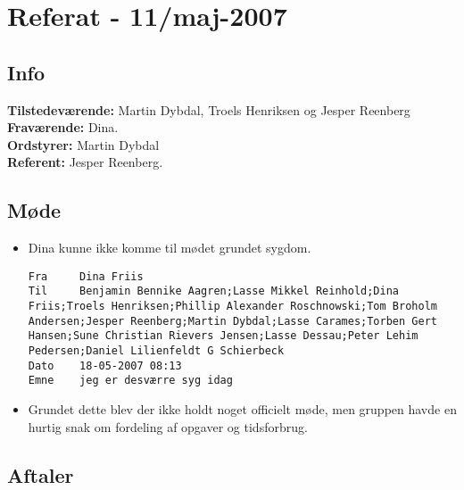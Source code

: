 \documentclass[a4paper,10pt,draft]{article}
\begin{document}
\section{Referat - 11/maj-2007}

\subsection{Info}

\textbf{Tilstedeværende:} Martin Dybdal, Troels Henriksen og Jesper Reenberg\\
\textbf{Fraværende:} Dina.\\
\textbf{Ordstyrer:} Martin Dybdal\\
\textbf{Referent:} Jesper Reenberg.

\subsection{Møde}

\begin{itemize}

\item Dina kunne ikke komme til mødet grundet sygdom.
\begin{verbatim}
Fra 	Dina Friis
Til 	Benjamin Bennike Aagren;Lasse Mikkel Reinhold;Dina Friis;Troels Henriksen;Phillip Alexander Roschnowski;Tom Broholm Andersen;Jesper Reenberg;Martin Dybdal;Lasse Carames;Torben Gert Hansen;Sune Christian Rievers Jensen;Lasse Dessau;Peter Lehim Pedersen;Daniel Lilienfeldt G Schierbeck
Dato 	18-05-2007 08:13
Emne 	jeg er desværre syg idag
\end{verbatim}


\item Grundet dette blev der ikke holdt noget officielt møde, men gruppen havde en hurtig snak om fordeling af opgaver og tidsforbrug.

\end{itemize}

\subsection{Aftaler}
\end{document}
